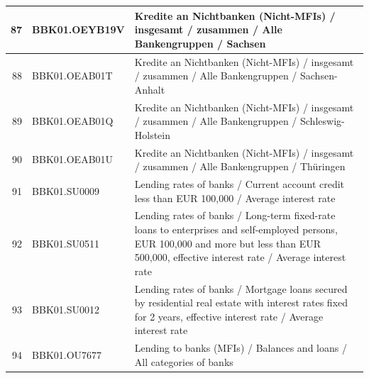 \documentclass[12pt]{article}
\begin{document}
\begin{table}
\begin{tabular}{rp{5cm}p{11cm}}
  \hline
  87 & BBK01.OEYB19V & Kredite an Nichtbanken (Nicht-MFIs) / insgesamt / zusammen / Alle Bankengruppen / Sachsen \\ 
  \hline
  88 & BBK01.OEAB01T & Kredite an Nichtbanken (Nicht-MFIs) / insgesamt / zusammen / Alle Bankengruppen / Sachsen-Anhalt \\ 
  \hline
  89 & BBK01.OEAB01Q & Kredite an Nichtbanken (Nicht-MFIs) / insgesamt / zusammen / Alle Bankengruppen / Schleswig-Holstein \\ 
  \hline
  90 & BBK01.OEAB01U & Kredite an Nichtbanken (Nicht-MFIs) / insgesamt / zusammen / Alle Bankengruppen / Thüringen \\ 
  \hline
  91 & BBK01.SU0009 & Lending rates of banks / Current account credit less than EUR 100,000 / Average interest rate \\ 
  \hline
  92 & BBK01.SU0511 & Lending rates of banks / Long-term fixed-rate loans to enterprises and self-employed persons, EUR 100,000 and more but less than EUR 500,000, effective interest rate / Average interest rate \\ 
  \hline
  93 & BBK01.SU0012 & Lending rates of banks / Mortgage loans secured by residential real estate with interest rates fixed for 2 years, effective interest rate / Average interest rate \\ 
  \hline
  94 & BBK01.OU7677 & Lending to banks (MFIs) / Balances and loans / All categories of banks \\ 
\end{tabular}
\end{table}
\end{document}
